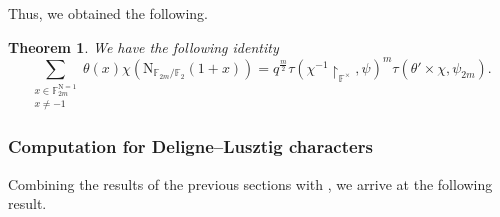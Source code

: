 \documentclass[12pt, reqno]{amsart}
\newtheorem{theorem}{Theorem}[section]
\theoremstyle{definition}
\theoremstyle{definition}
\theoremstyle{definition}
\newcommand{\multiplicativegroup}[1]{#1^{\times}}
\newcommand{\fieldCharacter}{\psi}
\newcommand{\aFieldNorm}{\mathrm{N}}
\newcommand{\finiteField}{\mathbb{F}}
\newcommand{\finiteFieldExtension}[1]{\finiteField_{#1}}
\newcommand{\NormOneGroup}[1]{\finiteFieldExtension{#1}^{\aFieldNorm = 1}}
\newcommand{\GaussSumSingleCharacter}[2]{\tau\left(#1, #2\right)}
\newcommand{\GaussSumCharacter}[3]{\tau\left(#1 \times #2, #3\right)}
\begin{document}
Thus, we obtained the following.
\begin{theorem}
	We have the following identity $$\sum_{\substack{x \in \NormOneGroup{2m}\\
			x \ne -1}} \theta \left(x\right) \chi\left(\aFieldNorm_{\finiteFieldExtension{2m} \slash \finiteFieldExtension{2}}\left(1 + x\right)\right) = q^{\frac{m}{2}} \GaussSumSingleCharacter{\chi^{-1} \restriction_{\multiplicativegroup{\finiteField}}}{\fieldCharacter}^m \GaussSumCharacter{\theta'}{\chi}{\fieldCharacter_{2m}}.$$
\end{theorem}

\subsubsection{Computation for Deligne--Lusztig characters}
Combining the results of the previous sections with , we arrive at the following result.
\end{document}
